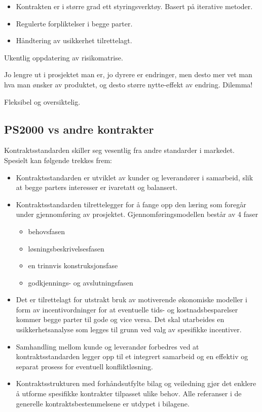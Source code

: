 \documentclass[11pt]{article}
\begin{document}
\begin{itemize}
\item Kontrakten er i større grad ett styringsverktøy. Basert på iterative metoder.
\item Regulerte forpliktelser i begge parter.
\item Håndtering av usikkerhet tilrettelagt.
\end{itemize}

  Ukentlig oppdatering av risikomatrise.

  Jo lengre ut i prosjektet man er, jo dyrere er endringer, 
  men desto mer vet man hva man ønsker av produktet, 
  og desto større nytte-effekt av endring. Dilemma!

  Fleksibel og oversiktelig.
\subsection{PS2000 vs andre kontrakter}
\label{sec-11.3}


   Kontraktsstandarden skiller seg vesentlig fra andre standarder i markedet. 
   Spesielt kan følgende trekkes frem: 

\begin{itemize}
\item Kontraktsstandarden er utviklet av kunder og leverandører i samarbeid, 
     slik at begge parters interesser er ivaretatt og balansert.
\item Kontraktsstandarden tilrettelegger for å fange opp den læring som foregår under gjennomføring av prosjektet. 
     Gjennomføringsmodellen består av 4 faser

\begin{itemize}
\item behovsfasen
\item løsningsbeskrivelsesfasen
\item en trinnvis konstruksjonsfase
\item godkjennings- og avslutningsfasen
\end{itemize}

\item Det er tilrettelagt for utstrakt bruk av motiverende økonomiske modeller i form av incentivordninger
     for at eventuelle tids- og kostnadsbesparelser kommer begge parter til gode og vice versa. 
     Det skal utarbeides en usikkerhetsanalyse som legges til grunn ved valg av spesifikke incentiver.
\item Samhandling mellom kunde og leverandør forbedres 
     ved at kontraktsstandarden legger opp til et integrert samarbeid 
     og en effektiv og separat prosess for eventuell konfliktløsning.
\item Kontraktsstrukturen med forhåndsutfylte bilag og veiledning gjør det enklere å utforme spesifikke kontrakter tilpasset ulike behov. 
     Alle referanser i de generelle kontraktsbestemmelsene er utdypet i bilagene.
\end{itemize}
\end{document}
